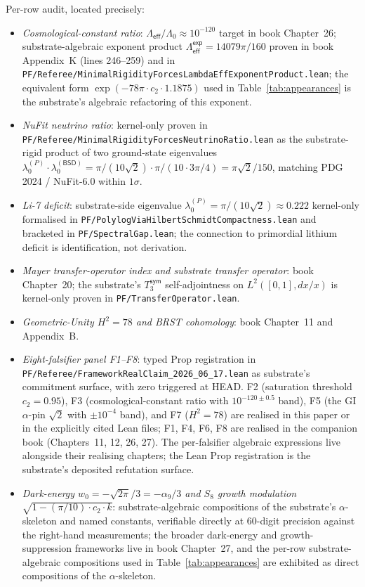 \documentclass[11pt,a4paper]{amsart}
\theoremstyle{plain}
\theoremstyle{definition}
\begin{document}
Per-row audit, located precisely:
\begin{itemize}[itemsep=2pt]
\item \emph{Cosmological-constant ratio}: $\Lambda_{\textsf{eff}}/\Lambda_0 \approx 10^{-120}$ target in book Chapter~26; substrate-algebraic exponent product $\Lambda_{\textsf{eff}}^{\textsf{exp}} = 14079\pi/160$ proven in book Appendix~K (lines 246--259) and in \texttt{PF/Referee/MinimalRigidityForcesLambdaEffExponentProduct.lean}; the equivalent form $\exp(-78\pi\cdot c_2\cdot 1.1875)$ used in Table~\ref{tab:appearances} is the substrate's algebraic refactoring of this exponent.
\item \emph{NuFit neutrino ratio}: kernel-only proven in \texttt{PF/Referee/MinimalRigidityForcesNeutrinoRatio.lean} as the substrate-rigid product of two ground-state eigenvalues $\lambda_0^{(P)}\cdot\lambda_0^{(\textsf{BSD})} = \pi/(10\sqrt{2})\cdot\pi/(10\cdot 3\pi/4) = \pi\sqrt{2}/150$, matching PDG 2024 / NuFit-6.0 within $1\sigma$.
\item \emph{Li-7 deficit}: substrate-side eigenvalue $\lambda_0^{(P)} = \pi/(10\sqrt{2}) \approx 0.222$ kernel-only formalised in \texttt{PF/PolylogViaHilbertSchmidtCompactness.lean} and bracketed in \texttt{PF/SpectralGap.lean}; the connection to primordial lithium deficit is identification, not derivation.
\item \emph{Mayer transfer-operator index and substrate transfer operator}: book Chapter~20; the substrate's $T_3^{\textsf{sym}}$ self-adjointness on $L^2([0,1], dx/x)$ is kernel-only proven in \texttt{PF/TransferOperator.lean}.
\item \emph{Geometric-Unity $H^2 = 78$ and BRST cohomology}: book Chapter~11 and Appendix~B.
\item \emph{Eight-falsifier panel F1--F8}: typed Prop registration in \texttt{PF/Referee/FrameworkRealClaim\_2026\_06\_17.lean} as substrate's commitment surface, with zero triggered at HEAD. F2 (saturation threshold $c_2 = 0.95$), F3 (cosmological-constant ratio with $10^{-120\pm 0.5}$ band), F5 (the GI $\alpha$-pin $\sqrt{2}$ with $\pm 10^{-4}$ band), and F7 ($H^2 = 78$) are realised in this paper or in the explicitly cited Lean files; F1, F4, F6, F8 are realised in the companion book (Chapters~11, 12, 26, 27). The per-falsifier algebraic expressions live alongside their realising chapters; the Lean Prop registration is the substrate's deposited refutation surface.
\item \emph{Dark-energy $w_0 = -\sqrt{2\pi}/3 = -\alpha_9/3$ and $S_8$ growth modulation $\sqrt{1 - (\pi/10)\cdot c_2\cdot k}$}: substrate-algebraic compositions of the substrate's $\alpha$-skeleton and named constants, verifiable directly at 60-digit precision against the right-hand measurements; the broader dark-energy and growth-suppression frameworks live in book Chapter~27, and the per-row substrate-algebraic compositions used in Table~\ref{tab:appearances} are exhibited as direct compositions of the $\alpha$-skeleton.

\end{itemize}
\end{document}

